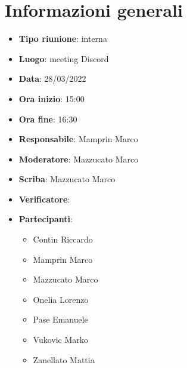 \section{Informazioni generali}
\begin{itemize}
  \item \textbf{Tipo riunione}: interna
  \item \textbf{Luogo}: meeting Discord
  \item \textbf{Data}: 28/03/2022
  \item \textbf{Ora inizio}: 15:00
  \item \textbf{Ora fine}: 16:30
  \item \textbf{Responsabile}: Mamprin Marco
  \item \textbf{Moderatore}: Mazzucato Marco
  \item \textbf{Scriba}: Mazzucato Marco
  \item \textbf{Verificatore}:
  \item \textbf{Partecipanti}:
  \begin{itemize}
    \item Contin Riccardo
    \item Mamprin Marco
    \item Mazzucato Marco
    \item Onelia Lorenzo
    \item Pase Emanuele
    \item Vukovic Marko
    \item Zanellato Mattia
  \end{itemize}
\end{itemize}
